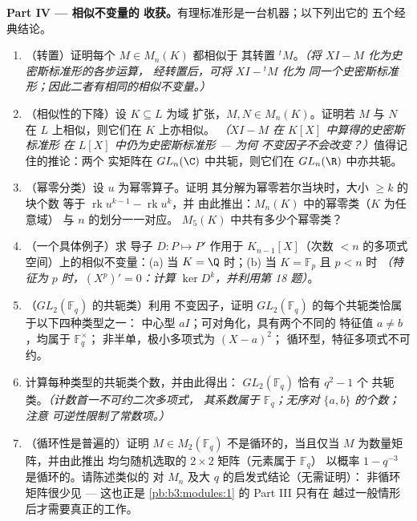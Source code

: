 \begin{problem}
\medskip
\noindent\textbf{Part IV --- 相似不变量的
收获。}有理标准形是一台机器；以下列出它的
五个经典结论。
\begin{enumerate}[resume]
  \item （转置）证明每个 $M \in M_n(K)$ 都相似于
        其转置 ${}^tM$。\emph{（将 $XI - M$ 化为史密斯标准形的各步运算，
        经转置后，可将 $XI - {}^tM$ 化为
        同一个史密斯标准形；因此二者有相同的相似不变量。）}
  \item （相似性的下降）设 $K \subseteq L$ 为域
        扩张，$M, N \in M_n(K)$。证明若 $M$ 与 $N$
        在 $L$ 上相似，则它们在 $K$ 上亦相似。
        \emph{（$XI - M$ 在 $K[X]$ 中算得的史密斯标准形
        在 $L[X]$ 中仍为史密斯标准形 --- 为何
        不变因子不会改变？）}值得记住的推论：两个
        实矩阵在 $GL_n(\C)$ 中共轭，则它们在
        $GL_n(\R)$ 中亦共轭。
  \item （幂零分类）设 $u$ 为幂零算子。证明
        其分解为幂零若尔当块时，大小 $\geq k$ 的块个数
        等于
        $\operatorname{rk}u^{k-1} - \operatorname{rk}u^k$，并
        由此推出：$M_n(K)$ 中的幂零类（$K$ 为任意域）
        与 $n$ 的划分一一对应。
        $M_5(K)$ 中共有多少个幂零类？
  \item （一个具体例子）求
        导子 $D\colon P \mapsto P'$ 作用于
        $K_{n-1}[X]$（次数 $< n$ 的多项式空间）上的相似不变量：(a) 当 $K =
        \Q$ 时；(b) 当 $K = \mathbb F_p$ 且 $p < n$ 时
        \emph{（特征为 $p$ 时，$(X^p)' = 0$：计算
        $\ker D^k$，并利用第 18 题）}。
  \item （$GL_2(\mathbb F_q)$ 的共轭类）利用
        不变因子，证明
        $GL_2(\mathbb F_q)$ 的每个共轭类恰属于以下四种类型之一：
        中心型 $aI$；可对角化，具有两个不同的
        特征值 $a \neq b$，均属于 $\mathbb F_q^\times$；
        非半单，极小多项式为 $(X - a)^2$；
        循环型，特征多项式不可约。
  \item 计算每种类型的共轭类个数，并由此得出：
        $GL_2(\mathbb F_q)$ 恰有 $q^2 - 1$ 个
        共轭类。\emph{（计数首一不可约二次多项式，
        其系数属于 $\mathbb F_q$；无序对 $\{a, b\}$ 的个数；注意
        可逆性限制了常数项。）}
  \item （循环性是普遍的）证明 $M \in M_2(\mathbb F_q)$
        不是循环的，当且仅当 $M$ 为数量矩阵，并由此推出
        均匀随机选取的 $2\times2$ 矩阵（元素属于 $\mathbb F_q$）
        以概率 $1 - q^{-3}$ 是循环的。请陈述类似的
        对 $M_n$ 及大 $q$ 的启发式结论（无需证明）：
        非循环矩阵很少见 --- 这也正是
        \cref{pb:b3:modules:1} 的 Part III 只有在
        越过一般情形后才需要真正的工作。
\end{enumerate}


\end{problem}
